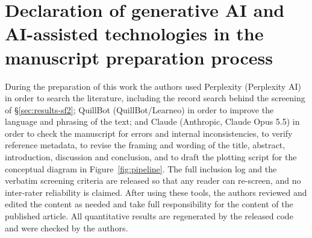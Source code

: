 \documentclass[a4paper,fleqn]{cas-dc}
\begin{document}
\section*{Declaration of generative AI and AI-assisted technologies in the manuscript preparation process}
During the preparation of this work the authors used Perplexity (Perplexity AI) in order to
search the literature, including the record search behind the screening of
\S\ref{sec:results-sf2}; QuillBot (QuillBot/Learneo) in order to improve the language and
phrasing of the text; and Claude (Anthropic, Claude Opus 5.5) in order to check the manuscript for errors and internal inconsistencies, to verify reference metadata, to revise the framing and wording of the title, abstract, introduction, discussion and conclusion, and to draft the plotting script for the conceptual
diagram in Figure~\ref{fig:pipeline}. The full inclusion log and the verbatim screening criteria
are released so that any reader can re-screen, and no inter-rater reliability is claimed. After
using these tools, the authors reviewed and edited the content as needed and take full
responsibility for the content of the published article. All quantitative results are
regenerated by the released code and were checked by the authors.



\end{document}
